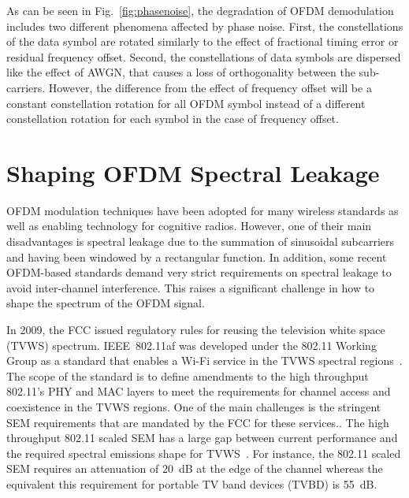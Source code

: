 As can be seen in Fig.~\ref{fig:phasenoise}, the degradation of OFDM demodulation includes two different phenomena affected by phase noise.
First, the constellations of the data symbol are rotated similarly to the effect of fractional timing error or residual frequency offset.
Second, the constellations of data symbols are dispersed like the effect of AWGN, that causes a loss of orthogonality between the sub-carriers.
However, the difference from the effect of frequency offset will be a constant constellation rotation for all OFDM symbol instead of a different constellation rotation for each symbol in the case of  frequency offset.


\section{Shaping OFDM Spectral Leakage}
\label{Ch2:SpecLeak}
OFDM modulation techniques have been adopted for many wireless standards as well as enabling technology for cognitive radios.
However, one of their main disadvantages is spectral leakage due to the summation of sinusoidal subcarriers and having been windowed by a rectangular function.
In addition, some recent OFDM-based standards demand very strict requirements on spectral leakage to avoid inter-channel interference.
This raises a significant challenge in how to shape the spectrum of the OFDM signal. 

In 2009, the FCC issued regulatory rules for reusing the television white space (TVWS) spectrum.
IEEE~802.11af was developed under the 802.11 Working Group as a standard that enables a Wi-Fi service in the TVWS spectral regions~\cite{802-11af2013}. 
The scope of the standard is to define amendments to the high throughput 802.11's PHY and MAC layers to meet the requirements for channel access and coexistence in the TVWS regions.
One of the main challenges is the stringent SEM requirements that are mandated by the FCC for these services.. 
The high throughput 802.11 scaled SEM has a large gap between current performance and the required spectral emissions shape for TVWS~\cite{Shellhammer2009}.
For instance, the 802.11 scaled SEM requires an attenuation of 20~dB at the edge of the channel whereas the equivalent this requirement for portable TV band devices (TVBD) is 55~dB.

